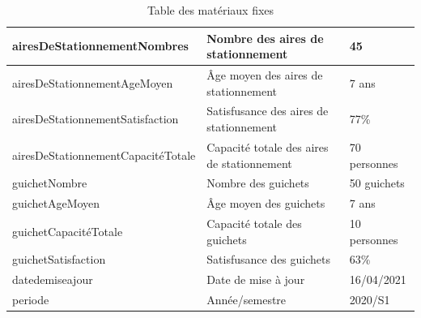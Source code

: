 \documentclass[a4paper]{report}
\begin{document}
\begin{doublespace}
\begin{table}[H]
\begin{center}
\begin{tabularx}{17.5cm}{|X|X|p{2.5cm}|}
				\hline
				airesDeStationnementNombres        & Nombre des aires de stationnement          & 45               \\
				\hline
				airesDeStationnementAgeMoyen       & Âge moyen des aires de stationnement       & 7 ans            \\
				\hline
				airesDeStationnementSatisfaction   & Satisfusance des aires de stationnement    & 77\%             \\
				\hline
				airesDeStationnementCapacitéTotale & Capacité totale des aires de stationnement & 70 personnes     \\
				\hline
				guichetNombre                      & Nombre des guichets                        & 50 guichets      \\
				\hline
				guichetAgeMoyen                    & Âge moyen des guichets                     & 7 ans            \\
				\hline
				guichetCapacitéTotale              & Capacité totale des guichets               & 10 personnes     \\
				\hline
				guichetSatisfaction                & Satisfusance des guichets                  & 63\%             \\
				\hline
				datedemiseajour                    & Date de mise à jour                        & 16/04/2021       \\
				\hline
				periode                            & Année/semestre                             & 2020/S1          \\
				\hline
			\end{tabularx}
			\caption{Table des matériaux fixes}
		\end{center}
	\end{table}


\end{doublespace}
\end{document}
